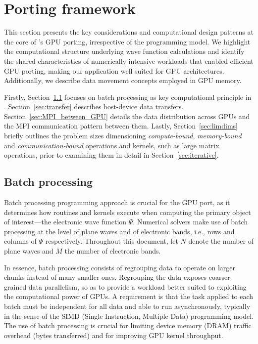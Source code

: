 \documentclass[twocolumn,superscriptaddress]{revtex4-1}
\begin{document}
\section{Porting framework}\label{sec:gen_port}

This section presents the key considerations and computational design patterns at the core of \abinit{}'s GPU porting, irrespective of the programming model. We highlight the computational structure underlying wave function calculations and identify the shared characteristics of numerically intensive workloads that enabled efficient GPU porting, making our application well suited for GPU architectures. Additionally, we describe data movement concepts employed in GPU memory.

Firstly, Section~\ref{sec:batch} focuses on batch processing as key computational principle in \abinit. Section~\ref{sec:transfer} describes host-device data transfers. Section~\ref{sec:MPI_between_GPU} details the data distribution across GPUs and the MPI communication pattern between them. Lastly, Section~\ref{sec:limdims} briefly outlines the problem sizes dimensioning \textit{compute-bound}, \textit{memory-bound} and \textit{communication-bound} operations and kernels, such as large matrix operations, prior to examining them in detail in Section~\ref{sec:iterative}.

\subsection{Batch processing} \label{sec:batch}

Batch processing programming approach is crucial for the GPU port, as it determines how routines and kernels execute when computing the primary object of interest---the electronic wave function $\Psi$. Numerical solvers make use of batch processing at the level of plane waves and of electronic bands, i.e., rows and columns of $\Psi$ respectively. Throughout this document, let $N$ denote the number of plane waves and $M$ the number of electronic bands.

In essence, batch processing consists of regrouping data to operate on larger chunks instead of many smaller ones. Regrouping the data exposes coarser-grained data parallelism, so as to provide a workload better suited to exploiting the computational power of GPUs. A requirement is that the task applied to each batch must be independent for all data and able to run asynchronously, typically in the sense of the SIMD (Single Instruction, Multiple Data) programming model. The use of batch processing is crucial for limiting device memory (DRAM) traffic overhead (bytes transferred) and for improving GPU kernel throughput.
\end{document}
